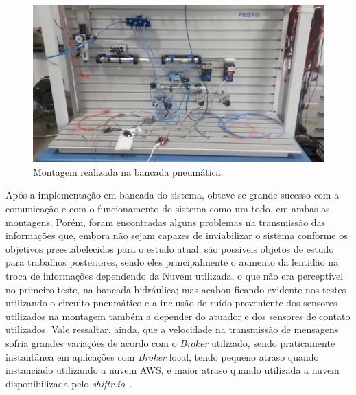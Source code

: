 \begin{figure}[htb]
    \begin{center}
	    \includegraphics[scale=0.5]{figs/exp_p.png}
	\end{center}
	\caption{\label{fig:exp2} Montagem realizada na bancada pneumática.} 
\end{figure}


Após a implementação em bancada do sistema, obteve-se grande sucesso com a comunicação e com o funcionamento do sistema como um todo,
em ambas as montagens. Porém, foram encontradas alguns problemas na transmissão das informações que, embora não sejam
capazes de inviabilizar o sistema conforme os objetivos preestabelecidos para o estudo atual, são possíveis objetos de 
estudo para trabalhos posteriores, sendo eles principalmente o aumento da lentidão na troca de informações dependendo da 
Nuvem utilizada, o que não era perceptível no primeiro teste, na bancada hidráulica; mas acabou ficando evidente nos testes
utilizando o circuito pneumático e a inclusão de ruído proveniente dos sensores utilizados na montagem
também a depender do atuador e dos sensores de contato utilizados. Vale ressaltar, ainda, que a velocidade na transmissão
de mensagens sofria grandes variações de acordo com o \textit{Broker} utilizado, sendo praticamente instantânea em aplicações com
\textit{Broker} local, tendo pequeno atraso quando instanciado utilizando a nuvem AWS, e maior atraso quando utilizada a
nuvem disponibilizada pelo \textit{shiftr.io}~\textregistered.